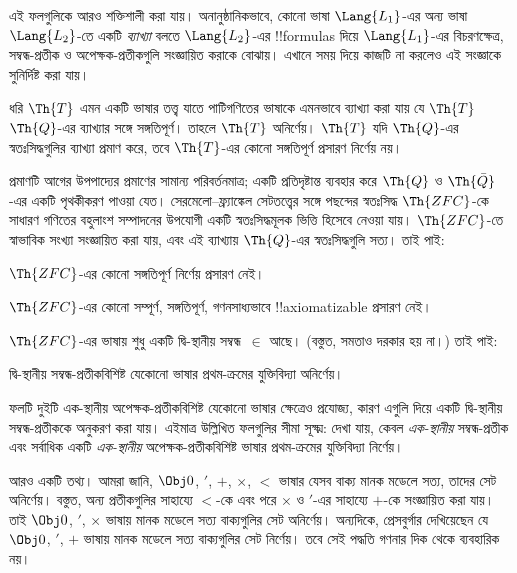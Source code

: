 \documentclass[../../../include/open-logic-section]{subfiles}
\begin{document}


এই ফলগুলিকে আরও শক্তিশালী করা যায়। অনানুষ্ঠানিকভাবে, কোনো ভাষা
$\Lang{L_1}$-এর অন্য ভাষা~$\Lang{L_2}$-তে একটি \emph{ব্যাখ্যা} বলতে
$\Lang{L_2}$-এর !!{formula}s দিয়ে $\Lang{L_1}$-এর বিচরণক্ষেত্র,
সম্বন্ধ-প্রতীক ও অপেক্ষক-প্রতীকগুলি সংজ্ঞায়িত করাকে বোঝায়। এখানে সময়
দিয়ে কাজটি না করলেও এই সংজ্ঞাকে সুনির্দিষ্ট করা যায়।

\begin{thm}
  ধরি $\Th{T}$ এমন একটি ভাষার তত্ত্ব যাতে পাটিগণিতের ভাষাকে এমনভাবে
  ব্যাখ্যা করা যায় যে $\Th{T}$ $\Th{Q}$-এর ব্যাখ্যার সঙ্গে
  সঙ্গতিপূর্ণ। তাহলে $\Th{T}$ অনির্ণেয়। $\Th{T}$ যদি $\Th{Q}$-এর
  স্বতঃসিদ্ধগুলির ব্যাখ্যা প্রমাণ করে, তবে $\Th{T}$-এর কোনো
  সঙ্গতিপূর্ণ প্রসারণ নির্ণেয় নয়।
\end{thm}

প্রমাণটি আগের উপপাদ্যের প্রমাণের সামান্য পরিবর্তনমাত্র; একটি
প্রতিদৃষ্টান্ত ব্যবহার করে $\Th{Q}$ ও $\Th{\bar Q}$-এর একটি পৃথকীকরণ
পাওয়া যেত। সেরমেলো--ফ্র্যাঙ্কেল সেটতত্ত্বের সঙ্গে পছন্দের স্বতঃসিদ্ধ
$\Th{ZFC}$-কে সাধারণ গণিতের বহুলাংশ সম্পাদনের উপযোগী একটি স্বতঃসিদ্ধমূলক
ভিত্তি হিসেবে নেওয়া যায়। $\Th{ZFC}$-তে স্বাভাবিক সংখ্যা সংজ্ঞায়িত করা
যায়, এবং এই ব্যাখ্যায় $\Th{Q}$-এর স্বতঃসিদ্ধগুলি সত্য। তাই পাই:

\begin{cor}
$\Th{ZFC}$-এর কোনো সঙ্গতিপূর্ণ নির্ণেয় প্রসারণ নেই।
\end{cor}

\begin{cor}
$\Th{ZFC}$-এর কোনো সম্পূর্ণ, সঙ্গতিপূর্ণ, গণনসাধ্যভাবে
!!{axiomatizable} প্রসারণ নেই।
\end{cor}

$\Th{ZFC}$-এর ভাষায় শুধু একটি দ্বি-স্থানীয় সম্বন্ধ~$\in$ আছে।
(বস্তুত, সমতাও দরকার হয় না।) তাই পাই:

\begin{cor}
দ্বি-স্থানীয় সম্বন্ধ-প্রতীকবিশিষ্ট যেকোনো ভাষার প্রথম-ক্রমের যুক্তিবিদ্যা
অনির্ণেয়।
\end{cor}

ফলটি দুইটি এক-স্থানীয় অপেক্ষক-প্রতীকবিশিষ্ট যেকোনো ভাষার ক্ষেত্রেও
প্রযোজ্য, কারণ এগুলি দিয়ে একটি দ্বি-স্থানীয় সম্বন্ধ-প্রতীককে অনুকরণ করা
যায়। এইমাত্র উল্লিখিত ফলগুলির সীমা সূক্ষ্ম: দেখা যায়, কেবল
\emph{এক-স্থানীয়} সম্বন্ধ-প্রতীক এবং সর্বাধিক একটি \emph{এক-স্থানীয়}
অপেক্ষক-প্রতীকবিশিষ্ট ভাষার প্রথম-ক্রমের যুক্তিবিদ্যা নির্ণেয়।

আরও একটি তথ্য। আমরা জানি, $\Obj 0$, $'$, $+$, $\times$, $<$ ভাষার
যেসব বাক্য মানক মডেলে সত্য, তাদের সেট অনির্ণেয়। বস্তুত, অন্য প্রতীকগুলির
সাহায্যে $<$-কে এবং পরে $\times$ ও $'$-এর সাহায্যে $+$-কে সংজ্ঞায়িত
করা যায়। তাই $\Obj 0$, $'$, $\times$ ভাষায় মানক মডেলে সত্য বাক্যগুলির
সেট অনির্ণেয়। অন্যদিকে, প্রেসবুর্গার দেখিয়েছেন যে $\Obj 0$, $'$, $+$
ভাষায় মানক মডেলে সত্য বাক্যগুলির সেট নির্ণেয়। তবে সেই পদ্ধতি গণনার
দিক থেকে ব্যবহারিক নয়।
\end{document}
